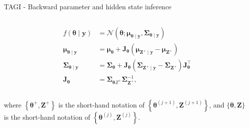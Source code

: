 \documentclass[final]{beamer}
\begin{document}
\begin{frame}[t]
\begin{columns}
\begin{column}[T]{.31\textwidth}
\begin{block}{TAGI - Backward parameter and hidden state inference}
\begin{columns}
\begin{column}{0.5\textwidth}
\begin{equation*}
\begin{split}
f(\boldsymbol{\theta} \mid \boldsymbol{y}) &=\mathcal{N}\left(\boldsymbol{\theta} ; \boldsymbol{\mu}_{\boldsymbol{\theta} \mid \boldsymbol{y}}, \boldsymbol{\Sigma}_{\boldsymbol{\theta} \mid \boldsymbol{y}}\right) \\
\boldsymbol{\mu}_{\boldsymbol{\theta} \mid \boldsymbol{y}} &=\boldsymbol{\mu}_{\boldsymbol{\theta}}+\mathbf{J}_{\boldsymbol{\theta}}\left(\boldsymbol{\mu}_{\boldsymbol{Z}^{+} \mid \boldsymbol{y}}-\boldsymbol{\mu}_{\boldsymbol{Z}^{+}}\right) \\
\boldsymbol{\Sigma}_{\boldsymbol{\theta} \mid \boldsymbol{y}} &=\boldsymbol{\Sigma}_{\boldsymbol{\theta}}+\mathbf{J}_{\boldsymbol{\theta}}\left(\boldsymbol{\Sigma}_{\boldsymbol{Z}^{+} \mid \boldsymbol{y}}-\boldsymbol{\Sigma}_{\boldsymbol{Z}^{+}}\right) \mathbf{J}_{\boldsymbol{\theta}}^{\top} \\
\mathbf{J}_{\boldsymbol{\theta}} &=\boldsymbol{\Sigma}_{\boldsymbol{\theta} Z^{+}} \boldsymbol{\Sigma}_{\boldsymbol{Z}^{+}}^{-1},
\end{split}
\end{equation*}
\end{column}
\end{columns}
where $\left\{\boldsymbol{\theta}^{+}, \boldsymbol{Z}^{+}\right\}$ is the short-hand notation of $\left\{\boldsymbol{\theta}^{(j+1)}, \boldsymbol{Z}^{(j+1)}\right\}$, and $\{\boldsymbol{\theta}, \boldsymbol{Z}\}$ is the short-hand notation of  $\left\{\boldsymbol{\theta}^{(j)}, \boldsymbol{Z}^{(j)}\right\}$.
\end{block}



\end{column}
\end{columns}
\end{frame}
\end{document}
